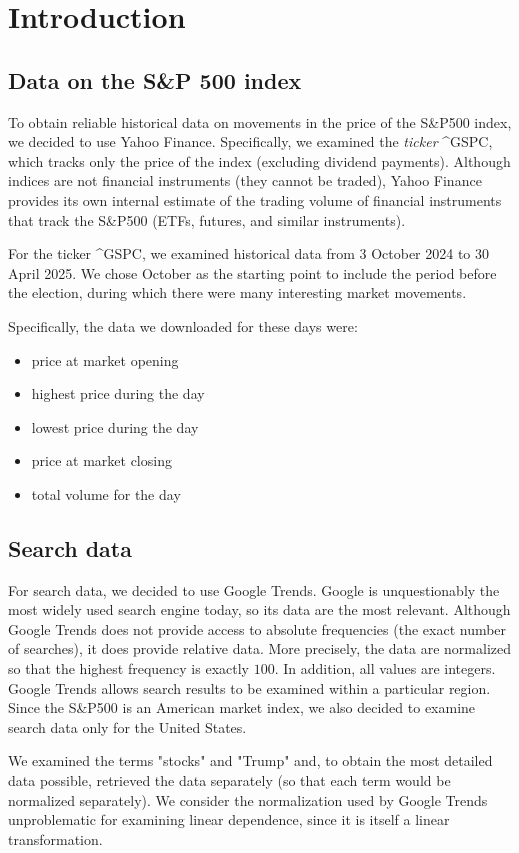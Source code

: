 \documentclass[../main.tex]{subfiles}
\begin{document}
\newpage
\section{Introduction}

\subsection{Data on the S\&P 500 index}

To obtain reliable historical data on movements in the price of the S\&P500 index, we decided to use Yahoo Finance. Specifically, we examined the \textit{ticker} \^{}GSPC, which tracks only the price of the index (excluding dividend payments). Although indices are not financial instruments (they cannot be traded), Yahoo Finance provides its own internal estimate of the trading volume of financial instruments that track the S\&P500 (ETFs, futures, and similar instruments).

For the ticker \^{}GSPC, we examined historical data from 3 October 2024 to 30 April 2025. We chose October as the starting point to include the period before the election, during which there were many interesting market movements.

Specifically, the data we downloaded for these days were:
\begin{itemize}
\item price at market opening
\item highest price during the day
\item lowest price during the day
\item price at market closing
\item total volume for the day
\end{itemize}


\subsection{Search data}

For search data, we decided to use Google Trends. Google is unquestionably the most widely used search engine today, so its data are the most relevant. Although Google Trends does not provide access to absolute frequencies (the exact number of searches), it does provide relative data. More precisely, the data are normalized so that the highest frequency is exactly $100$. In addition, all values are integers. Google Trends allows search results to be examined within a particular region. Since the S\&P500 is an American market index, we also decided to examine search data only for the United States.

We examined the terms "stocks" and "Trump" and, to obtain the most detailed data possible, retrieved the data separately (so that each term would be normalized separately). We consider the normalization used by Google Trends unproblematic for examining linear dependence, since it is itself a linear transformation.
\end{document}
